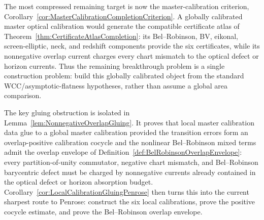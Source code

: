 The most compressed remaining target is now the master-calibration criterion, Corollary~\ref{cor:MasterCalibrationCompletionCriterion}. A globally calibrated master optical calibration would generate the compatible certificate atlas of Theorem~\ref{thm:CertificateAtlasCompletion}: its Bel--Robinson, BV, eikonal, screen-elliptic, neck, and redshift components provide the six certificates, while its nonnegative overlap current charges every chart mismatch to the optical defect or horizon currents. Thus the remaining breakthrough problem is a single construction problem: build this globally calibrated object from the standard WCC/asymptotic-flatness hypotheses, rather than assume a global area comparison.

The key gluing obstruction is isolated in Lemma~\ref{lem:NonnegativeOverlapGluing}. It proves that local master calibration data glue to a global master calibration provided the transition errors form an overlap-positive calibration cocycle and the nonlinear Bel--Robinson mixed terms admit the overlap envelope of Definition~\ref{def:BelRobinsonOverlapEnvelope}: every partition-of-unity commutator, negative chart mismatch, and Bel--Robinson barycentric defect must be charged by nonnegative currents already contained in the optical defect or horizon absorption budget. Corollary~\ref{cor:LocalCalibrationGluingPenrose} then turns this into the current sharpest route to Penrose: construct the six local calibrations, prove the positive cocycle estimate, and prove the Bel--Robinson overlap envelope.

